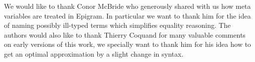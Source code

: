 We would like to thank Conor McBride who generously shared with us how meta
variables are treated in Epigram. In particular we want to thank him for the
idea of naming possibly ill-typed terms which simplifies equality reasoning.
The authors would also like to thank Thierry Coquand for many valuable comments
on early versions of this work, we specially want to thank him for his idea how
to get an optimal approximation by a slight change in syntax.


